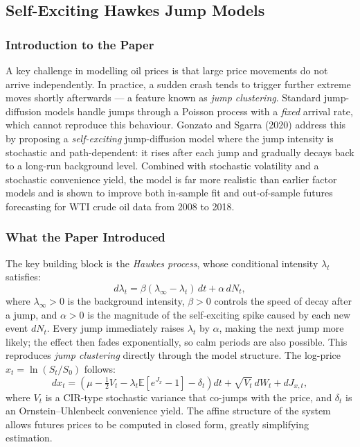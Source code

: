 \documentclass[12pt,a4paper]{article}
\begin{document}
\subsection*{Self-Exciting Hawkes Jump Models}

\subsubsection*{Introduction to the Paper}

A key challenge in modelling oil prices is that large price
movements do not arrive independently. In practice, a sudden
crash tends to trigger further extreme moves shortly afterwards
--- a feature known as \textit{jump clustering}. Standard
jump-diffusion models handle jumps through a Poisson process with
a \textit{fixed} arrival rate, which cannot reproduce this
behaviour. Gonzato and Sgarra (2020) address this by proposing a
\textit{self-exciting} jump-diffusion model where the jump
intensity is stochastic and path-dependent: it rises after each
jump and gradually decays back to a long-run background level.
Combined with stochastic volatility and a stochastic convenience
yield, the model is far more realistic than earlier factor models
and is shown to improve both in-sample fit and out-of-sample
futures forecasting for WTI crude oil data from 2008 to 2018.

\subsubsection*{What the Paper Introduced}

The key building block is the \textit{Hawkes process}, whose
conditional intensity $\lambda_t$ satisfies:
\begin{equation}
    d\lambda_t = \beta(\lambda_{\infty} - \lambda_t)\,dt
    + \alpha\,dN_t,
\end{equation}
where $\lambda_\infty>0$ is the background intensity, $\beta>0$
controls the speed of decay after a jump, and $\alpha>0$ is the
magnitude of the self-exciting spike caused by each new event
$dN_t$. Every jump immediately raises $\lambda_t$ by $\alpha$,
making the next jump more likely; the effect then fades
exponentially, so calm periods are also possible. This reproduces
\textit{jump clustering} directly through the model structure.
The log-price $x_t = \ln(S_t/S_0)$ follows:
\begin{equation}
    dx_t = \!\left(\mu - \tfrac{1}{2}V_t
    - \lambda_t\mathbb{E}[e^{J_x}-1]
    - \delta_t\right)dt
    + \sqrt{V_t}\,dW_t + dJ_{x,t},
\end{equation}
where $V_t$ is a CIR-type stochastic variance that co-jumps with
the price, and $\delta_t$ is an Ornstein--Uhlenbeck convenience
yield. The affine structure of the system allows futures prices
to be computed in closed form, greatly simplifying estimation.
\end{document}
